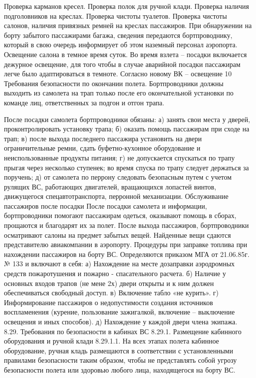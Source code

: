 Проверка карманов кресел.
Проверка полок для ручной клади.
Проверка наличия подголовников на креслах.
Проверка чистоты туалетов.
Проверка чистоты салонов, наличия привязных ремней на креслах пассажиров.
При обнаружении на борту забытого пассажирами багажа, сведения передаются бортпроводнику, который в свою очередь информирует об этом наземный персонал аэропорта.
Освещение салона в темное время суток.
Во время взлета – посадки включается дежурное освещение, для того чтобы в случае аварийной посадки пассажирам легче было адаптироваться в темноте. Согласно новому ВК – освещение 10%
Требования безопасности по окончании полета.
Бортпроводники должны выходить из самолета на трап только после его окончательной установки по команде лиц, ответственных за подгон и отгон трапа.

После посадки самолета бортпроводники обязаны:
а)	занять свои места у дверей, проконтролировать установку трапа;
б)	оказать помощь пассажирам при сходе на трап;
в)	после выхода последнего пассажира установить на двери ограничительные ремни, сдать буфетно-кухонное оборудование и неиспользованные продукты питания;
г)	не допускается спускаться по трапу прыгая через несколько ступенек; во время спуска по трапу следует держаться за поручень;
д)	от самолета по перрону следовать безопасным путем с учетом рулящих ВС, работающих двигателей, вращающихся лопастей винтов, движущегося спецавтотранспорта, перронной механизации.
Обслуживание пассажиров после посадки
После посадки самолета и информации, бортпроводники помогают пассажирам одеться, оказывают помощь в сборах, прощаются и благодарят их за полет.
После выхода пассажиров, бортпроводники осматривают салоны на предмет забытых вещей.
Найденные вещи сдаются представителю авиакомпании в аэропорту.
Процедуры при заправке топлива при нахождении пассажиров на борту ВС.
Определяются приказом МГА от 21.06.85г. № 133 и включают в себя:
а)	Нахождение на месте дозаправки аэродромных средств пожаротушения и пожарно - спасательного расчета.
б)	Наличие у основных входов трапов (не мене 2х) двери открыты и к ним должен обеспечиваться свободный доступ.
в)	Включение табло «не курить».
г)	Информирование пассажиров о недопустимости создания источников воспламенения (курение, пользование зажигалкой, включение – выключение освещения и иных способов).
д)	Нахождение у каждой двери члена экипажа.
8.29. Требования по безопасности в кабинах ВС
8.29.1. Размещение кабинного оборудования и ручной клади
8.29.1.1. На всех этапах полета кабинное оборудование, ручная кладь размещаются в соответствии с установленными правилами безопасности таким образом, чтобы не представлять собой угрозу безопасности полета или здоровью любого лица, находящегося на борту ВС.

